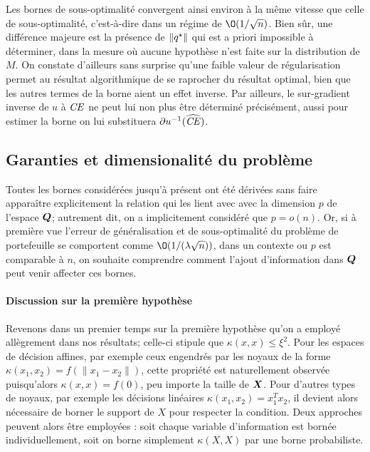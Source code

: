 Les bornes de sous-optimalité convergent ainsi environ à la même vitesse que celle de
sous-optimalité, c'est-à-dire dans un régime de $\O(1/\sqrt{n})$. Bien sûr, une différence
majeure est la présence de $\|q^\star\|$ qui est a priori impossible à déterminer, dans la
mesure où aucune hypothèse n'est faite sur la distribution de $M$. On constate d'ailleurs
sans surprise qu'une faible valeur de régularisation permet au résultat algorithmique de
se raprocher du résultat optimal, bien que les autres termes de la borne aient un effet
inverse. Par ailleurs, le sur-gradient inverse de $u$ à $\operatorname{\mbox{\textit{CE}}}$ ne peut lui non plus être
déterminé précisément, aussi pour estimer la borne on lui substituera $\partial u^{-1}(\operatorname{\widehat{\operatorname{\mbox{\textit{CE}}}}})$. 




\subsection{Garanties et dimensionalité du problème}
\label{b:dim}

Toutes les bornes considérées jusqu'à présent ont été dérivées sans faire apparaître
explicitement la relation qui les lient avec avec la dimension $p$ de l'espace $\bm Q$;
autrement dit, on a implicitement considéré que $p=o(n)$. Or, si à première vue l'erreur
de généralisation et de sous-optimalité du problème de portefeuille se comportent comme
$\O(1/(\lambda \sqrt{n}))$, dans un contexte ou $p$ est comparable à $n$, on souhaite comprendre
comment l'ajout d'information dans $\bm Q$ peut venir affecter ces bornes.



\paragraph{Discussion sur la première hypothèse}


Revenons dans un premier temps sur la première hypothèse qu'on a employé allègrement dans
nos résultats; celle-ci stipule que $\kappa(x,x) \leq \xi^2$. Pour les espaces de décision affines,
par exemple ceux engendrés par les noyaux de la forme $\kappa(x_1,x_2) = f(\|x_1-x_2\|)$, cette
propriété est naturellement observée puisqu'alors $\kappa(x,x) = f(0)$, peu importe la taille
de $\bm{X}$. Pour d'autres types de noyaux, par exemple les décisions linéaires
$\kappa(x_1,x_2) = x_1^Tx_2$, il devient alors nécessaire de borner le support de $X$ pour
respecter la condition. Deux approches peuvent alors être employées : soit chaque variable
d'information est bornée individuellement, soit on borne simplement $\kappa(X,X)$ par une borne
probabiliste.


